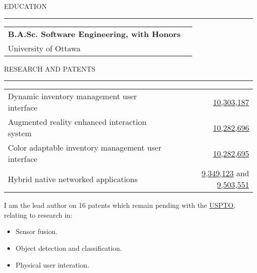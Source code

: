 \documentclass[12pt]{article}
\makeatletter
\newenvironment{justifycolumns}
{\begin{tabular*}{\textwidth}{@{\extracolsep{\fill}}lr@{}}}
{\end{tabular*}}
\newcommand{\row}[2]{#1 & #2 \\}
\newcommand{\rowheading}[2]{\row{\textbf{#1}}{\textbf{#2}}}
\newcommand{\blockseparation}{\vspace{0.15in}}
\newcommand{\heading}[1]{
	\blockseparation
	\uppercase{#1}
	\vspace{0.05in}
	\hrule
	\blockseparation
}
\newenvironment{tightbullets}
{\begin{itemize}}
{\end{itemize}}
\newenvironment{bullets}
{\begin{tightbullets}}
{\end{tightbullets} \blockseparation}
\makeatother
\begin{document}
\begin{flushleft}
\heading{Education}

\begin{justifycolumns}
	\rowheading{B.A.Sc. Software Engineering, with Honors}{}
	\row{University of Ottawa}{}
\end{justifycolumns}

\blockseparation


\heading{Research and Patents}

\begin{justifycolumns}
	\row{Dynamic inventory management user interface}
	{\href{http://patft.uspto.gov/netacgi/nph-Parser?Sect1=PTO1\&Sect2=HITOFF\&d=PALL\&p=1\&u=\%2Fnetahtml\%2FPTO\%2Fsrchnum.htm\&r=1\&f=G\&l=50\&s1=10,303,187.PN.\&OS=PN/10,303,187\&RS=PN/10,303,187}{10,303,187}}
   	\row{Augmented reality enhanced interaction system}
   	{\href{http://patft.uspto.gov/netacgi/nph-Parser?Sect1=PTO1\&Sect2=HITOFF\&d=PALL\&p=1\&u=\%2Fnetahtml\%2FPTO\%2Fsrchnum.htm\&r=1\&f=G\&l=50\&s1=10,282,696.PN.\&OS=PN/10,282,696\&RS=PN/10,282,696}{10,282,696}}
	\row{Color adaptable inventory management user interface}
	{\href{http://patft.uspto.gov/netacgi/nph-Parser?Sect1=PTO1\&Sect2=HITOFF\&d=PALL\&p=1\&u=\%2Fnetahtml\%2FPTO\%2Fsrchnum.htm\&r=1\&f=G\&l=50\&s1=10,282,695.PN.\&OS=PN/10,282,695\&RS=PN/10,282,695}{10,282,695}}
	\row{Hybrid native networked applications}
	{\href{http://patft.uspto.gov/netacgi/nph-Parser?Sect1=PTO1\&Sect2=HITOFF\&d=PALL\&p=1\&u=\%2Fnetahtml\%2FPTO\%2Fsrchnum.htm\&r=1\&f=G\&l=50\&s1=9,349,123.PN.\&OS=PN/9,349,123\&RS=PN/9,349,123}{9,349,123} and \href{http://patft.uspto.gov/netacgi/nph-Parser?Sect1=PTO1\&Sect2=HITOFF\&d=PALL\&p=1\&u=\%2Fnetahtml\%2FPTO\%2Fsrchnum.htm\&r=1\&f=G\&l=50\&s1=9,503,551.PN.\&OS=PN/9,503,551\&RS=PN/9,503,551}{9,503,551}}
\end{justifycolumns}

\blockseparation

I am the lead author on 16 patents which remain pending with the \href{http://patft.uspto.gov/netacgi/nph-Parser?Sect1=PTO2\&Sect2=HITOFF\&p=1\&u=\%2Fnetahtml\%2FPTO\%2Fsearch-bool.html\&r=0\&f=S\&l=50\&TERM1=McNamara\%2C+Alexander+Michael\&FIELD1=INNM\&co1=AND\&TERM2=\&FIELD2=\&d=PTXT}{USPTO}, relating to research in:
\begin{bullets}
	\item Sensor fusion.
	\item Object detection and classification.
	\item Physical user interation.
\end{bullets}

\end{flushleft}
\end{document}
